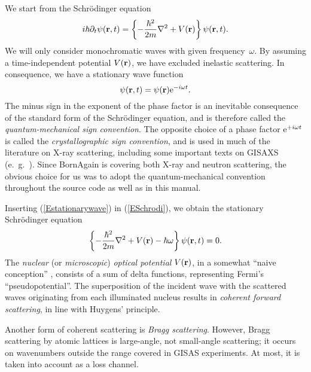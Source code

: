 We start from the Schrödinger equation
\begin{equation}\label{ESchrodi}
  i\hbar\partial_t \psi(\mathbf{r},t)
  = \left\{-\frac{\hbar^2}{2m}\mathbf{\nabla}^2+V(\mathbf{r})\right\} \psi(\mathbf{r},t).
\end{equation}
We will only consider monochromatic waves with given frequency~$\omega$.
By assuming a time-independent potential $V(\mathbf{r})$,
we have excluded inelastic scattering.
In consequence, we have a stationary wave function
\begin{equation}\label{Estationarywave}
  \psi(\mathbf{r},t) = \psi(\mathbf{r}){\rm e}^{-i\omega t}.
\end{equation}
The minus sign in the exponent of the phase factor
is an inevitable consequence of the standard form of the Schrödinger equation,
and is therefore called the \textit{quantum-mechanical sign convention}.
The opposite choice of a phase factor ${\rm e}^{+i\omega t}$ is 
called the \textit{crystallographic sign convention},
and is used in much of the literature on X-ray scattering,
including some important texts on GISAXS (e.~g.\ \cite{ReLL09}).
Since BornAgain is covering both X-ray and neutron scattering,
the obvious choice for us was to adopt the quantum-mechanical convention
throughout the source code as well as in this manual.

Inserting (\ref{Estationarywave}) in (\ref{ESchrodi}),
we obtain the stationary Schrödinger equation
\begin{equation}\label{EstatSchrodi}
  \left\{-\frac{\hbar^2}{2m}\mathbf{\nabla}^2+V(\mathbf{r})-\hbar\omega\right\} \psi(\mathbf{r},t) = 0.
\end{equation}
The \textit{nuclear} (or \textit{microscopic})
\textit{optical potential} $V(\mathbf{r})$,
in a somewhat ``naive conception'' \cite[p.~7]{Sea89},
consists of a sum of delta functions,
representing Fermi's ``pseudopotential''.
The superposition of the incident wave with the scattered waves
originating from each illuminated nucleus
results in \textit{coherent forward scattering},%
in line with Huygens' principle.%

Another form of coherent scattering is \textit{Bragg scattering}.%
However, Bragg scattering by atomic lattices
is large-angle, not small-angle scattering;
it occurs on wavenumbers outside the range covered in GISAS experiments.
At most, it is taken into account as a loss channel.

